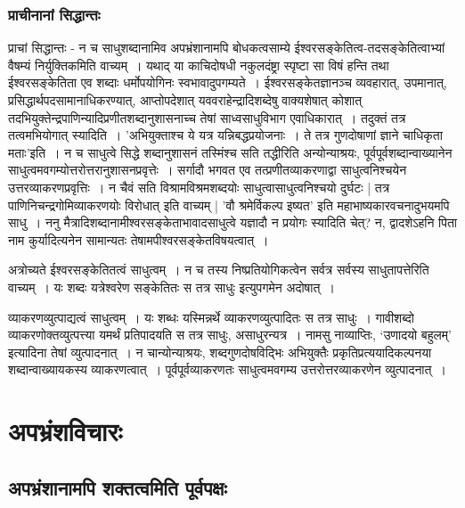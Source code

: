 	
			\subsubsection{प्राचीनानां सिद्धान्तः}
			
				प्राचां सिद्धान्तः - न च साधुशब्दानामिव अपभ्रंशानामपि बोधकत्वसाम्ये ईश्वरसङ्केतित्व-तदसङ्केतित्वाभ्यां वैषम्यं निर्युक्तिकमिति वाच्यम्~। यथाद् या काचिदोषधी नकुलदंष्ट्रा स्पृष्टा सा विषं हन्ति तथा ईश्वरसङ्केतिता एव शब्दाः धर्मोपयोगिनः स्वभावादुपगम्यते~। ईश्वरसङ्केतज्ञानञ्च व्यवहारात्, उपमानात्, प्रसिद्धार्थपदसामानाधिकरण्यात्, आप्तोपदेशात् यववराहेन्द्रादिशब्देषु वाक्यशेषात् कोशात् तदभियुक्तेन्द्रपाणिन्यादिप्रणीतशब्दानुशासनाच्च तेषां साध्वसाधुविभाग एवाधिकारात्~। तदुक्तं तत्र तत्वमभियोगात् स्यादिति~। ’अभियुक्ताश्च ये यत्र यन्निबद्धप्रयोजनाः~। ते तत्र गुणदोषाणां ज्ञाने चाधिकृता मताः’इति~। न च साधुत्वे सिद्धे शब्दानुशासनं तस्मिंश्च सति तद्धीरिति अन्योन्याश्रयः, पूर्वपूर्वशब्दान्वाख्यानेन साधुत्वमवगम्योत्तरोत्तरानुशासनप्रवृत्तेः~। सर्गादौ भगवत एव तत्प्रणीतव्याकरणाद्वा साधुत्वनिश्चयेन उत्तरव्याकरणप्रवृत्तिः~। न चैवं सति विश्रामविश्रमशब्दयोः साधुत्वासाधुत्वनिश्चयो दुर्घटः | तत्र पाणिनिचन्द्रगोमिव्याकरणयोः विरोधात् इति वाच्यम् | ’वौ श्रमेर्विकल्प इष्यत’ इति महाभाष्यकारवचनादुभयमपि साधु~। ननु मैत्रादिशब्दानामीश्वरसङ्केताभावादसाधुत्वे यज्ञादौ न प्रयोगः स्यादिति चेत्? न, द्वादशेऽहनि पिता नाम कुर्यादित्यनेन सामान्यतः तेषामपीश्वरसङ्केतविषयत्वात्~। 
	
				अत्रोच्यते ईश्वरसङ्केतितत्वं साधुत्वम्~। न च तस्य निष्प्रतियोगिकत्वेन सर्वत्र सर्वस्य साधुतापत्तेरिति वाच्यम्~। यः शब्दः यत्रेश्वरेण सङ्केतितः स तत्र साधुः इत्युपगमेन अदोषात्~। 

				व्याकरणव्युत्पाद्यत्वं साधुत्वम्~। यः शब्धः यस्मिन्नर्थे व्याकरणव्युत्पादितः स तत्र साधुः~। गावीशब्दो व्याकरणोक्तव्युत्पत्त्या यमर्थं प्रतिपादयति स तत्र साधुः, असाधुरन्यत्र~। नामसु नाव्याप्तिः, ‘उणादयो बहुलम्’ इत्यादिना तेषां व्युत्पादनात्~। न चान्योन्याश्रयः, शब्दगुणदोषविद्भिः अभियुक्तैः प्रकृतिप्रत्ययादिकल्पनया शब्दान्वाख्यायकस्य व्याकरणत्वात्~। पूर्वपूर्वव्याकरणतः साधुत्वमवगम्य उत्तरोत्तरव्याकरणेन व्युत्पादनात्~।
	
	\section{अपभ्रंशविचारः}

		\subsection{अपभ्रंशानामपि शक्तत्वमिति पूर्वपक्षः}
		
